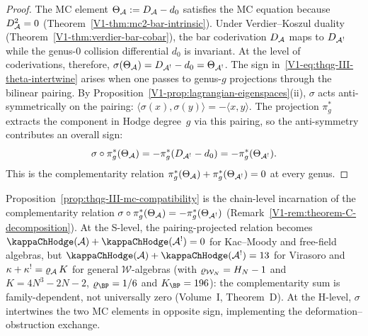 \begin{proof}
The MC element $\Theta_{\mathcal{A}} := D_{\mathcal{A}} - d_0$ satisfies the MC
equation because $D_{\mathcal{A}}^2 = 0$
(Theorem~\ref*{V1-thm:mc2-bar-intrinsic}).
Under Verdier--Koszul duality
(Theorem~\ref*{V1-thm:verdier-bar-cobar}), the bar
coderivation $D_{\mathcal{A}}$ maps to $D_{\mathcal{A}^!}$ while the genus-$0$
collision differential $d_0$ is invariant. At the level of
coderivations, therefore,
$\sigma(\Theta_{\mathcal{A}}) = D_{\mathcal{A}^!} - d_0 = \Theta_{\mathcal{A}^!}$.
The sign in~\eqref{V1-eq:thqg-III-theta-intertwine} arises when
one passes to genus-$g$ projections through the bilinear
pairing. By
Proposition~\ref{V1-prop:lagrangian-eigenspaces}(ii), $\sigma$
acts anti-symmetrically on the pairing:
$\langle \sigma(x), \sigma(y) \rangle
= -\langle x, y \rangle$.
The projection $\pi_g^*$ extracts the component in Hodge
degree~$g$ via this pairing, so the anti-symmetry contributes
an overall sign:
\[
\sigma \circ \pi_g^*(\Theta_{\mathcal{A}})
= -\pi_g^*(D_{\mathcal{A}^!} - d_0)
= -\pi_g^*(\Theta_{\mathcal{A}^!}).
\]
This is the complementarity relation
$\pi_g^*(\Theta_{\mathcal{A}}) + \pi_g^*(\Theta_{\mathcal{A}^!}) = 0$
at every genus.
\end{proof}

\begin{remark}
Proposition~\ref{prop:thqg-III-mc-compatibility} is the
chain-level incarnation of the complementarity relation
$\sigma \circ \pi_g^*(\Theta_{\mathcal{A}}) = -\pi_g^*(\Theta_{\mathcal{A}^!})$
(Remark~\ref{V1-rem:theorem-C-decomposition}).
At the S-level, the pairing-projected relation becomes
$\kappaChHodge(\cA) + \kappaChHodge(\cA^!) = 0$ for Kac--Moody and free-field algebras,
but $\kappaChHodge(\cA) + \kappaChHodge(\cA^!) = 13$ for Virasoro and
$\kappa + \kappa^! = \varrho_{\mathcal{A}}\,K$ for general $\mathcal{W}$-algebras
(with $\varrho_{\mathcal{W}_N} = H_N - 1$ and $K = 4N^3 - 2N - 2$,
$\varrho_{\BP} = 1/6$ and $K_{\BP} = 196$):
the complementarity sum is family-dependent, not universally
zero (Volume~I, Theorem~D).
At the H-level, $\sigma$ intertwines the two MC elements in
opposite sign, implementing the deformation--obstruction
exchange.
\end{remark}

